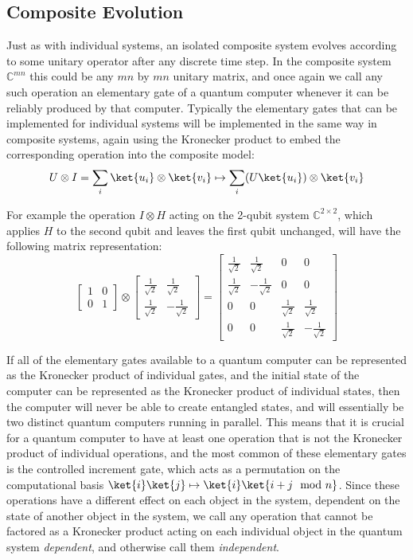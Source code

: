 \subsection{Composite Evolution}
Just as with individual systems, an isolated composite system evolves according to some unitary operator after any discrete time step. In the composite system $\mathbb{C}^{mn}$ this could be any $mn$ by $mn$ unitary matrix, and once again we call any such operation an elementary gate of a quantum computer whenever it can be reliably produced by that computer. Typically the elementary gates that can be implemented for individual systems will be implemented in the same way in composite systems, again using the Kronecker product to embed the corresponding operation into the composite model:
\[U \otimes I = \sum_i \ket{u_i}\otimes\ket{v_i} \mapsto \sum_i (U\ket{u_i})\otimes \ket{v_i}\]

For example the operation $I \otimes H$ acting on the 2-qubit system $\mathbb{C}^{2\times 2}$, which applies $H$ to the second qubit and leaves the first qubit unchanged, will have the following matrix representation:
\[
\left[\begin{matrix}
	1&0\\
	0&1
\end{matrix}\right]
\otimes
\left[\begin{matrix}
	\frac{1}{\sqrt{2}}&\frac{1}{\sqrt{2}}\\
	\frac{1}{\sqrt{2}}&-\frac{1}{\sqrt{2}}
\end{matrix}\right]
=
\left[\begin{matrix}
	\frac{1}{\sqrt{2}}&\frac{1}{\sqrt{2}}&0&0\\
	\frac{1}{\sqrt{2}}&-\frac{1}{\sqrt{2}}&0&0\\
	0&0&\frac{1}{\sqrt{2}}&\frac{1}{\sqrt{2}}\\
	0&0&\frac{1}{\sqrt{2}}&-\frac{1}{\sqrt{2}}
\end{matrix}\right]
\]

If all of the elementary gates available to a quantum computer can be represented as the Kronecker product of individual gates, and the initial state of the computer can be represented as the Kronecker product of individual states, then the computer will never be able to create entangled states, and will essentially be two distinct quantum computers running in parallel. This means that it is crucial for a quantum computer to have at least one operation that is not the Kronecker product of individual operations, and the most common of these elementary gates is the controlled increment gate, which acts as a permutation on the computational basis $\ket{i}\ket{j} \mapsto \ket{i}\ket{i+j \mod n}$. Since these operations have a different effect on each object in the system, dependent on the state of another object in the system, we call any operation that cannot be factored as a Kronecker product acting on each individual object in the quantum system \emph{dependent}, and otherwise call them \emph{independent}.

